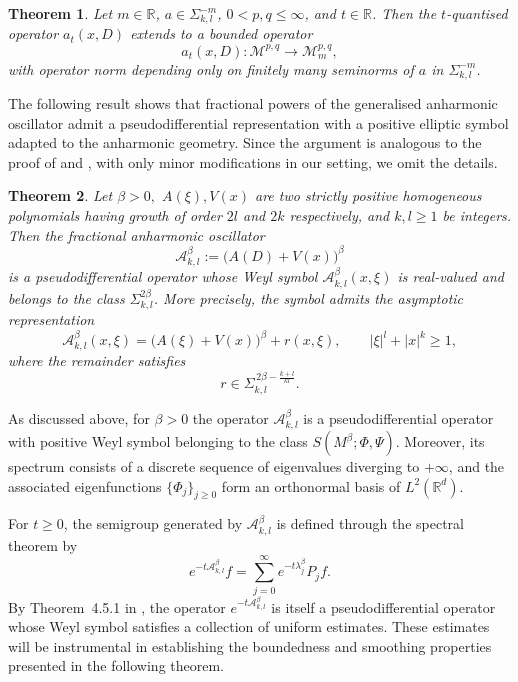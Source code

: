 \documentclass[12pt,reqno,a4paper]{amsart}
\numberwithin{equation}{section}
\theoremstyle{plain}
\newtheorem{theorem}{Theorem}[section]
\theoremstyle{definition}
\theoremstyle{remark}
\def \Ad{\mathcal{A}_{k,l}}
\begin{document}
\begin{theorem}
\label{quantisationtheorem}
Let $m\in\mathbb{R}$, $a\in\Sigma^{ -m }_{k,l}$, $0<p,q\leq \infty$, and $t\in\mathbb{R}$. Then the $t$-quantised operator $a_t(x,D)$ extends to a bounded operator
\[
a_t(x,D):\mathcal{M}^{p,q}\longrightarrow \mathcal{M}^{p,q}_{m},
\]
with operator norm depending only on finitely many seminorms of $a$ in $\Sigma^{ -m }_{k,l}$.
\end{theorem}
The following result shows that fractional powers of the generalised anharmonic oscillator admit a pseudodifferential representation with a positive elliptic symbol adapted to the anharmonic geometry. Since the argument is analogous to the proof of  \cite[Proposition~2.3]{MR4313961} and \cite[Theorem 3.3]{MR4944933}, with only minor modifications in our setting, we omit the details.


\begin{theorem}
\label{Calderontheorem}
Let $\beta>0,$ $A(\xi),V(x)$  are  two strictly positive homogeneous polynomials having growth of
order $2l$ and $2k$ respectively, and $k,l\ge 1$ be integers. Then the fractional anharmonic oscillator
\[
\mathcal{A}_{k,l}^{\beta}
:=
\bigl(A(D)+V(x)\bigr)^{\beta}
\]
is a pseudodifferential operator whose Weyl symbol $\Ad^{\beta}(x,\xi)$ is real-valued and belongs to the class $\Sigma^{2\beta}_{k,l}$. More precisely, the symbol admits the asymptotic representation
\begin{equation}
\label{assymtotic}
\mathcal{A}_{k,l}^{\beta}(x,\xi)
=
\bigl(A(\xi)+V(x)\bigr)^{\beta}
+
r(x,\xi),
\qquad
|\xi|^{l}+|x|^{k}\ge 1,
\end{equation}
where the remainder satisfies
\[
r \in \Sigma^{\,2\beta-\frac{k+l}{kl}}_{k,l}.
\]
\end{theorem}

As discussed above, for $\beta>0$ the operator $\mathcal{A}_{k,l}^{\beta}$ is a pseudodifferential operator with positive Weyl symbol belonging to the class $S(M^{\beta};\Phi,\Psi)$. Moreover, its spectrum consists of a discrete sequence of eigenvalues diverging to $+\infty$, and the associated eigenfunctions $\{\Phi_{j}\}_{j\geq 0}$ form an orthonormal basis of $L^{2}(\mathbb{R}^{d})$.

For $t\geq 0$, the semigroup generated by $\mathcal{A}_{k,l}^{\beta}$ is defined through the spectral theorem by
\[
e^{-t\mathcal{A}_{k,l}^{\beta}}f
=
\sum_{j=0}^{\infty}
e^{-t\lambda_{j}^{\beta}}
P_{j}f.
\]
By Theorem~4.5.1 in \cite{MR2668420}, the operator $e^{-t\mathcal{A}_{k,l}^{\beta}}$ is itself a pseudodifferential operator whose Weyl symbol satisfies a collection of uniform estimates. These estimates will be instrumental in establishing the boundedness and smoothing properties presented in the following theorem.
\end{document}
